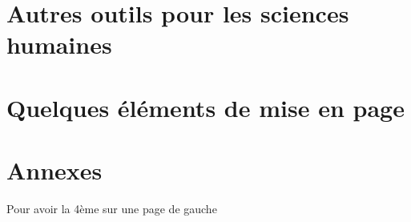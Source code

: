 \part{Autres outils pour les sciences humaines}





\part{Quelques éléments de mise en page}





\def\epi{Avec un escalier prévu pour la montée, on réussit souvent à monter plus bas qu'on serait descendu avec un escalier prévu pour la descente.}
\def\episource{Dicton shadok}
\appendix
\part{Annexes}











\setcounter{tocdepth}{2}
\tableofcontents

\ifpapierstandard
Pour avoir la 4ème sur une page de gauche
\makeatletter
\ifodd\c@TotPages
\newpage\hbox{}\newpage
\else
\newpage\hbox{}
\fi
\makeatother

\fi